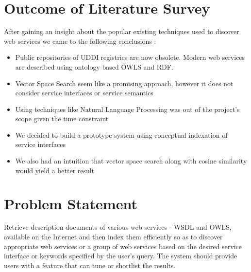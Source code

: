 \documentclass[12pt, oneside]{book}
\begin{document}
\section{Outcome of Literature Survey}
After gaining an insight about the popular existing techniques used to discover web services we came to the following conclusions :
\begin{itemize}
 \item Public repositories of UDDI registries are now obsolete. Modern web services are described using ontology based OWLS and RDF.
 \item Vector Space Search seem like a promising approach, however it does not consider service interfaces or service semantics
 \item Using techniques like Natural Language Processing was out of the project's scope given the time constraint
 \item We decided to build a prototype system using conceptual indexation of service interfaces
 \item We also had an intuition that vector space search along with cosine similarity would yield a better result
\end{itemize}

\section{Problem Statement}
Retrieve description documents of various web services - WSDL and OWLS, available on the Internet and then index them efficiently so as to discover appropriate web services or a group of web services based on the desired service interface or keywords specified by the user's query. The system should provide users with a feature that can tune or shortlist the results.
\end{document}
